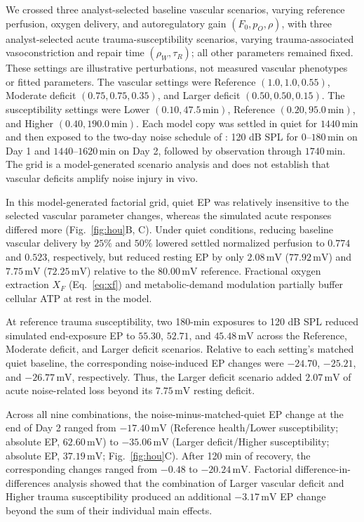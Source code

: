 \documentclass[final,5p,times]{elsarticle}
\begin{document}
We crossed three analyst-selected baseline vascular scenarios, varying reference perfusion, oxygen delivery, and autoregulatory gain \((F_0,p_O,\rho)\), with three analyst-selected acute trauma-susceptibility scenarios, varying trauma-associated vasoconstriction and repair time \((\rho_W,\tau_R)\); all other parameters remained fixed. These settings are illustrative perturbations, not measured vascular phenotypes or fitted parameters. The vascular settings were Reference \((1.0,1.0,0.55)\), Moderate deficit \((0.75,0.75,0.35)\), and Larger deficit \((0.50,0.50,0.15)\). The susceptibility settings were Lower \((0.10,47.5\,\mathrm{min})\), Reference \((0.20,95.0\,\mathrm{min})\), and Higher \((0.40,190.0\,\mathrm{min})\). Each model copy was settled in quiet for \(1440\,\mathrm{min}\) and then exposed to the two-day noise schedule of \citet{Hou2020}: 120 dB SPL for \(0\)--\(180\,\mathrm{min}\) on Day 1 and \(1440\)--\(1620\,\mathrm{min}\) on Day 2, followed by observation through \(1740\,\mathrm{min}\). The grid is a model-generated scenario analysis and does not establish that vascular deficits amplify noise injury in vivo.

In this model-generated factorial grid, quiet EP was relatively insensitive to the selected vascular parameter changes, whereas the simulated acute responses differed more (Fig.~\ref{fig:hou}B, C). Under quiet conditions, reducing baseline vascular delivery by \(25\%\) and \(50\%\) lowered settled normalized perfusion to \(0.774\) and \(0.523\), respectively, but reduced resting EP by only \(2.08\,\mathrm{mV}\) (\(77.92\,\mathrm{mV}\)) and \(7.75\,\mathrm{mV}\) (\(72.25\,\mathrm{mV}\)) relative to the \(80.00\,\mathrm{mV}\) reference. Fractional oxygen extraction \(X_F\) (Eq.~\ref{eq:xf}) and metabolic-demand modulation partially buffer cellular ATP at rest in the model.

At reference trauma susceptibility, two 180-min exposures to 120 dB SPL reduced simulated end-exposure EP to \(55.30\), \(52.71\), and \(45.48\,\mathrm{mV}\) across the Reference, Moderate deficit, and Larger deficit scenarios. Relative to each setting's matched quiet baseline, the corresponding noise-induced EP changes were \(-24.70\), \(-25.21\), and \(-26.77\,\mathrm{mV}\), respectively. Thus, the Larger deficit scenario added \(2.07\,\mathrm{mV}\) of acute noise-related loss beyond its \(7.75\,\mathrm{mV}\) resting deficit.

Across all nine combinations, the noise-minus-matched-quiet EP change at the end of Day 2 ranged from \(-17.40\,\mathrm{mV}\) (Reference health/Lower susceptibility; absolute EP, \(62.60\,\mathrm{mV}\)) to \(-35.06\,\mathrm{mV}\) (Larger deficit/Higher susceptibility; absolute EP, \(37.19\,\mathrm{mV}\); Fig.~\ref{fig:hou}C). After 120 min of recovery, the corresponding changes ranged from \(-0.48\) to \(-20.24\,\mathrm{mV}\). Factorial difference-in-differences analysis showed that the combination of Larger vascular deficit and Higher trauma susceptibility produced an additional \(-3.17\,\mathrm{mV}\) EP change beyond the sum of their individual main effects.
\end{document}
